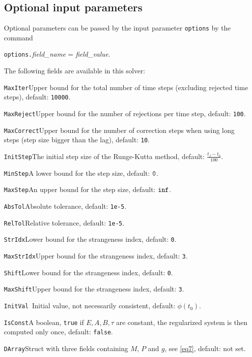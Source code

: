 \documentclass[final,reqno]{siamltex}
\renewenvironment{itemize}[1]{\begin{compactitem}#1}{\end{compactitem}}
\begin{document}
\subsection{Optional input parameters}
Optional parameters can be passed by the input parameter {\tt options} by the command 
\begin{center}
{\tt options.}{\it field\_name} = {\it field\_value}.
\end{center}
The following fields are available in this solver:
\begin{itemize}
\item {\tt MaxIter}\quad        Upper bound for the total number of time steps (excluding 
	rejected time steps), default: {\tt 10000}.
\item {\tt MaxReject}\quad      Upper bound for the number of rejections per time step, default: {\tt 100}.
\item{\tt MaxCorrect}\quad  Upper bound for the number of correction steps when using
         long steps (step size bigger than the lag), default: {\tt10}.
\item {\tt InitStep}\quad        The initial step size of the Runge-Kutta method, default: $\frac{t_f-t_0}{100}$.
\item {\tt MinStep}\quad         A lower bound for the step size, default: $\tt 0$.
\item {\tt MaxStep}\quad      An upper bound for the step size, default: $\tt inf$.
\item {\tt AbsTol}\quad       Absolute tolerance, default:  {\tt 1e-5}.
\item {\tt RelTol}\quad       Relative tolerance, default:  {\tt 1e-5}.
\item {\tt StrIdx}\quad       Lower bound for the strangeness index,  default: {\tt 0}.
\item {\tt MaxStrIdx}\quad    Upper bound for the strangeness index,  default: {\tt 3}.
\item {\tt Shift}\quad       Lower bound for the strangeness index,  default: {\tt 0}.
\item {\tt MaxShift}\quad    Upper bound for the strangeness index,  default: {\tt 3}.
\item {\tt InitVal  }\quad    Initial value, not necessarily consistent,  default: $\phi(t_0)$.
\item {\tt IsConst}\quad   A boolean, {\tt true} if $E,A,B,\tau$ are constant, the regularized system is then computed only once, default: {\tt false}.
\item {\tt DArray}\quad    Struct with three fields containing $M$, $P$ and $g$, see \eqref{eq7},  default: not set.
\end{itemize}
\end{document}

